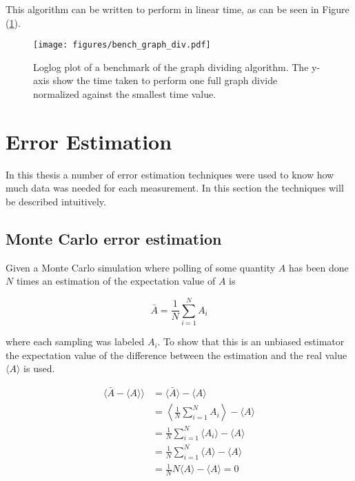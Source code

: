 This algorithm can be written to perform in linear time, as can be seen in Figure (\ref{fig:bench_graphdiv}). 

\begin{figure}[h!]
    \centering
        \texttt{[image: figures/bench\_graph\_div.pdf]}
    \caption{Loglog plot of a benchmark of the graph dividing algorithm. The y-axis show the time taken to perform one full graph divide normalized against the smallest time value.}
    \label{fig:bench_graphdiv}
\end{figure}

\section{Error Estimation}
\label{sec:ErrorEst}

In this thesis a number of error estimation techniques were used to know how much data was needed for each measurement. In this section the techniques will be described intuitively.

\subsection{Monte Carlo error estimation}
\label{subsec:MonteCarloErrorEst}

Given a Monte Carlo simulation where polling of some quantity $A$ has been done $N$ times an estimation of the expectation value of $A$ is

\begin{equation}
    \bar A = \frac{1}{N} \sum_{i = 1}^{N} A_i
\end{equation}

where each sampling was labeled $A_i$. To show that this is an unbiased estimator the expectation value of the difference between the estimation and the real value $\langle A \rangle$ is used.

\begin{align}
    \langle \bar A - \langle A \rangle \rangle &= \langle \bar A \rangle - \langle A \rangle \\
%
    &= \left \langle \frac{1}{N} \sum_{i = 1}^{N} A_i \right \rangle - \langle A \rangle \\
%
    &= \frac{1}{N} \sum_{i = 1}^{N} \langle A_i \rangle - \langle A \rangle \\
\label{eq:unbiasedEst}
%
    &= \frac{1}{N} \sum_{i = 1}^{N} \langle A \rangle - \langle A \rangle \\
%
    &= \frac{1}{N} N \langle A \rangle - \langle A \rangle = 0
\end{align}

